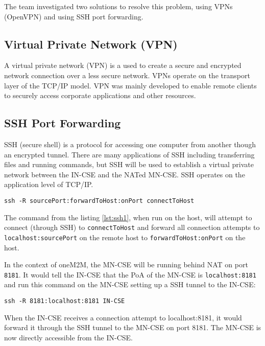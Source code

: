 The team investigated two solutions to resolve this problem, using VPNs (OpenVPN) and using SSH port forwarding.  

\subsection{Virtual Private Network (VPN)}

A virtual private network (VPN) is a used to create a secure and encrypted network connection over a less secure network. VPNs operate on the transport layer of the TCP/IP model. VPN was mainly developed to enable remote clients to securely access corporate applications and other resources.

\subsection{SSH Port Forwarding}

SSH (secure shell) is a protocol for accessing one computer from another though an encrypted tunnel. There are many applications of SSH including transferring files and running commands, but SSH will be used to establish a virtual private network between the IN-CSE and the NATed MN-CSE. SSH operates on the application level of TCP/IP.\\

\begin{lstlisting}[caption={SSH port forwarding}, label={lst:ssh1}]
ssh -R sourcePort:forwardToHost:onPort connectToHost
\end{lstlisting}

The command from the listing \ref{lst:ssh1}, when run on the host, will attempt to connect (through SSH) to \lstinline{connectToHost} and forward all connection attempts to \lstinline{localhost:sourcePort} on the remote host to \lstinline{forwardToHost:onPort} on the host.

In the context of oneM2M, the MN-CSE will be running behind NAT on port \lstinline{8181}. It would tell the IN-CSE that the PoA of the MN-CSE is \lstinline{localhost:8181} and run this command on the MN-CSE setting up a SSH tunnel to the IN-CSE:\\

\begin{lstlisting}[caption={SSH port fowarding with Values}, label={lst:ssh2}]
ssh -R 8181:localhost:8181 IN-CSE
\end{lstlisting}

When the IN-CSE receives a connection attempt to localhost:8181, it would forward it through the SSH tunnel to the MN-CSE on port 8181. The MN-CSE is now directly accessible from the IN-CSE. 

